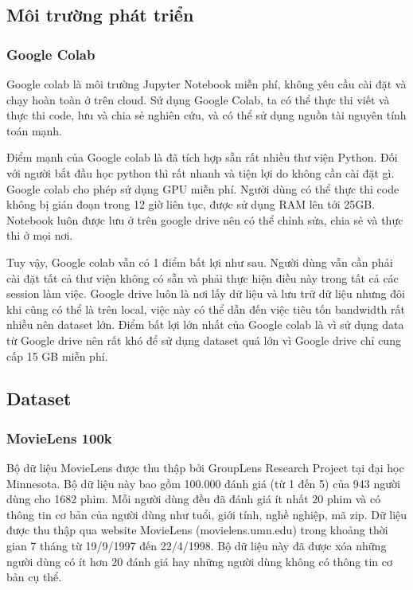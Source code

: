 \subsection{Môi trường phát triển}
\subsubsection{Google Colab}
Google colab là môi trường Jupyter Notebook miễn phí, không yêu cầu cài đặt và chạy hoàn toàn ở trên cloud. Sử dụng Google Colab, ta có thể thực thi viết và thực thi code, lưu và chia sẻ nghiên cứu, và có thể sử dụng nguồn tài nguyên tính toán mạnh.

Điểm mạnh của Google colab là đã tích hợp sẵn rất nhiều thư viện Python. Đối với người bắt đầu học python thì rất nhanh và tiện lợi do không cần cài đặt gì. Google colab cho phép sử dụng GPU miễn phí. Người dùng có thể thực thi code không bị gián đoạn trong 12 giờ liên tục, được sử dụng RAM lên tới 25GB. Notebook luôn được lưu ở trên google drive nên có thể chỉnh sửa, chia sẻ và thực thi ở mọi nơi.

Tuy vậy, Google colab vẫn có 1 điểm bất lợi như sau. Người dùng vẫn cần phải cài đặt tất cả thư viện không có sẵn và phải thực hiện điều này trong tất cả các session làm việc. Google drive luôn là nơi lấy dữ liệu và lưu trữ dữ liệu nhưng đôi khi cũng có thể là trên local, việc này có thể dẫn đến việc tiêu tốn bandwidth rất nhiều nên dataset lớn. Điểm bất lợi lớn nhất của Google colab là vì sử dụng data từ Google drive nên rất khó để sử dụng dataset quá lớn vì Google drive chỉ cung cấp 15 GB miễn phí.

\subsection{Dataset}
\subsubsection{MovieLens 100k}
Bộ dữ liệu MovieLens được thu thập bởi GroupLens Research Project tại đại học Minnesota.
Bộ dữ liệu này bao gồm 100.000 đánh giá (từ 1 đến 5) của 943 người dùng cho 1682 phim. Mỗi người dùng đều đã đánh giá ít nhất 20 phim và có thông tin cơ bản của người dùng như tuổi, giới tính, nghề nghiệp, mã zip.
\newline Dữ liệu được thu thập qua website MovieLens (movielens.umn.edu) trong khoảng thời gian 7 tháng từ 19/9/1997 đến 22/4/1998. Bộ dữ liệu này đã được xóa những người dùng có ít hơn 20 đánh giá hay những người dùng không có thông tin cơ bản cụ thể. 

